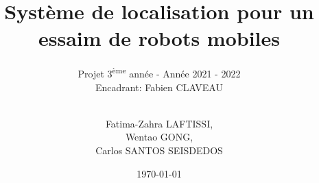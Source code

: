 \documentclass{article} %
\author{\\Fatima-Zahra LAFTISSI, \\ Wentao GONG, \\ Carlos SANTOS SEISDEDOS}
\date{\today}
\title{Système de localisation pour un essaim de robots mobiles}
\subtitle{Projet 3\textsuperscript{ème} année - Année 2021 - 2022 \\
\large{Encadrant: Fabien CLAVEAU}}
\begin{document}
\imtaMaketitlepage


\tableofcontents




%
%


{}


\imtaMakeCover
\end{document}
